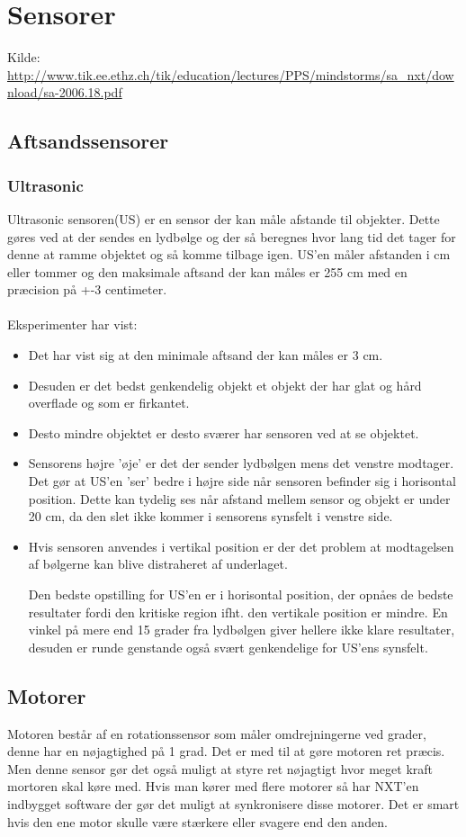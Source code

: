 \documentclass[a4paper,12pt]{report}
\begin{document}
\section{Sensorer}
Kilde: \url{http://www.tik.ee.ethz.ch/tik/education/lectures/PPS/mindstorms/sa_nxt/download/sa-2006.18.pdf}
\subsection{Aftsandssensorer}
\subsubsection{Ultrasonic}
Ultrasonic sensoren(US) er en sensor der kan måle afstande til objekter. Dette gøres ved at der sendes en lydbølge og der så beregnes hvor lang tid det tager for denne at ramme objektet og så komme tilbage igen.
US'en måler afstanden i cm eller tommer og den maksimale aftsand der kan måles er 255 cm med en præcision på +-3 centimeter.
\\
\\
Eksperimenter\cite{keylist} har vist:
\begin{itemize}
\item Det har vist sig at den minimale aftsand der kan måles er 3 cm.
\item Desuden er det bedst genkendelig objekt et objekt der har glat og hård overflade og som er firkantet.
\item Desto mindre objektet er desto sværer har sensoren ved at se objektet.
\item Sensorens højre 'øje' er det der sender lydbølgen mens det venstre modtager.
Det gør at US'en 'ser' bedre i højre side når sensoren befinder sig i horisontal position.
Dette kan tydelig ses når afstand mellem sensor og objekt er under 20 cm, da den slet ikke kommer i sensorens synsfelt i venstre side.
\item Hvis sensoren anvendes i vertikal position er der det problem at modtagelsen af bølgerne kan blive distraheret af underlaget.

Den bedste opstilling for US'en er i horisontal position, der opnåes de bedste resultater fordi den kritiske region ifht. den vertikale position er mindre.
En vinkel på mere end 15 grader fra lydbølgen giver hellere ikke klare resultater, desuden er runde genstande også svært genkendelige for US'ens synsfelt.
\end{itemize}

\subsection{Motorer}
Motoren består af en rotationssensor som måler omdrejningerne ved grader, denne har en nøjagtighed på 1 grad. Det er med til at gøre motoren ret præcis. Men denne sensor gør det også muligt at styre ret nøjagtigt hvor meget kraft mortoren skal køre med.
Hvis man kører med flere motorer så har NXT'en indbygget software der gør det muligt at synkronisere disse motorer.
Det er smart hvis den ene motor skulle være stærkere eller svagere end den anden.
\end{document}

